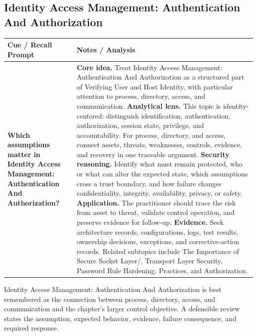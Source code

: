 \documentclass[11pt]{article}
\newcommand{\CornellHeader}{%
\rowcolor{Navy}\color{white}\bfseries Cue / Recall Prompt & \color{white}\bfseries Notes / Analysis\\\hline}
\newcommand{\CornellRow}[2]{%
\cellcolor{CueGray}\RaggedRight\textbf{#1} & \RaggedRight #2\\\hline}
\begin{document}
\subsection*{Identity Access Management: Authentication And Authorization}
\begin{longtable}{>{\RaggedRight\arraybackslash}p{}|>{\RaggedRight\arraybackslash}p{}}
\CornellHeader
\CornellRow{Which assumptions matter in Identity Access Management: Authentication And Authorization?}{\textbf{Core idea.} Treat Identity Access Management: Authentication And Authorization as a structured part of Verifying User and Host Identity, with particular attention to process, directory, access, and communication. \textbf{Analytical lens.} This topic is identity-centered: distinguish identification, authentication, authorization, session state, privilege, and accountability. For process, directory, and access, connect assets, threats, weaknesses, controls, evidence, and recovery in one traceable argument. \textbf{Security reasoning.} Identify what must remain protected, who or what can alter the expected state, which assumptions cross a trust boundary, and how failure changes confidentiality, integrity, availability, privacy, or safety. \textbf{Application.} The practitioner should trace the risk from asset to threat, validate control operation, and preserve evidence for follow-up. \textbf{Evidence.} Seek architecture records, configurations, logs, test results, ownership decisions, exceptions, and corrective-action records. Related subtopics include The Importance of Secure Socket Layer/, Transport Layer Security, Password Rule Hardening: Practices, and Authorization.}
\end{longtable}
\begin{topicsummary}
Identity Access Management: Authentication And Authorization is best remembered as the connection between process, directory, access, and communication and the chapter's larger control objective. A defensible review states the assumption, expected behavior, evidence, failure consequence, and required response.
\end{topicsummary}
\end{document}
